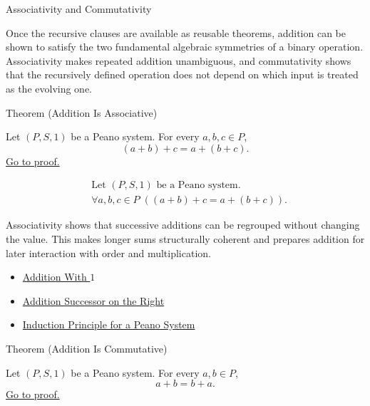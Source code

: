 \begin{topicbox}{Associativity and Commutativity}
\begin{exposition}
Once the recursive clauses are available as reusable theorems, addition can be
shown to satisfy the two fundamental algebraic symmetries of a binary
operation. Associativity makes repeated addition unambiguous, and
commutativity shows that the recursively defined operation does not depend on
which input is treated as the evolving one.
\end{exposition}

\begin{theorembox}{Theorem (Addition Is Associative)}
\begin{theorem}
\label{thm:addition-associative}
Let $(P,S,1)$ be a Peano system. For every $a,b,c \in P$,
\[
(a+b)+c=a+(b+c).
\]
\hyperref[prf:addition-associative]{Go to proof.}
\end{theorem}
\end{theorembox}

\begin{remark*}
\[
\begin{aligned}
&\text{Let } (P,S,1) \text{ be a Peano system.}\\
&\forall a,b,c \in P\;((a+b)+c=a+(b+c)).
\end{aligned}
\]
\end{remark*}

\begin{remark*}[Interpretation]
Associativity shows that successive additions can be regrouped without
changing the value. This makes longer sums structurally coherent and prepares
addition for later interaction with order and multiplication.
\end{remark*}

\begin{dependencies}
\begin{itemize}
  \item \hyperref[thm:addition-with-one]{Addition With $1$}
  \item \hyperref[thm:addition-successor-on-right]{Addition Successor on the Right}
  \item \hyperref[thm:induction-principle-for-peano-system]{Induction Principle for a Peano System}
\end{itemize}
\end{dependencies}

\begin{theorembox}{Theorem (Addition Is Commutative)}
\begin{theorem}
\label{thm:addition-commutative}
Let $(P,S,1)$ be a Peano system. For every $a,b \in P$,
\[
a+b=b+a.
\]
\hyperref[prf:addition-commutative]{Go to proof.}
\end{theorem}
\end{theorembox}


\end{topicbox}
